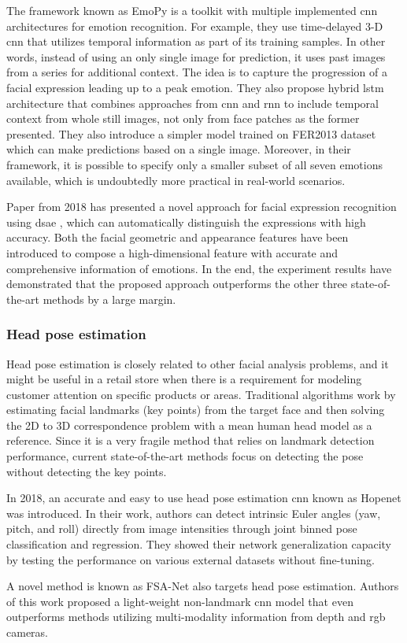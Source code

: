             The framework known as EmoPy \cite{emopy} is a toolkit with multiple implemented \gls{cnn} architectures for emotion recognition. For example, they use time-delayed 3-D \gls{cnn}  that utilizes temporal information as part of its training samples. In other words, instead of using an only single image for prediction, it uses past images from a series for additional context. The idea is to capture the progression of a facial expression leading up to a peak emotion. They also propose hybrid \gls{lstm} \cite{hochreiter1997long} architecture that combines approaches from \gls{cnn} and \gls{rnn} to include temporal context from whole still images, not only from face patches as the former presented. They also introduce a simpler model trained on FER2013 dataset \cite{goodfellow2013challenges} which can make predictions based on a single image. Moreover, in their framework, it is possible to specify only a smaller subset of all seven emotions available, which is undoubtedly more practical in real-world scenarios.
            
            Paper \cite{zeng2018facial} from 2018 has presented a novel approach for facial expression recognition using \gls{dsae} \cite{sun2016sparse}, which can automatically distinguish the expressions with high accuracy. Both the facial geometric and appearance features have been introduced to compose a high-dimensional feature with accurate and comprehensive information of emotions. In the end, the experiment results have demonstrated that the proposed approach outperforms the other three state-of-the-art methods by a large margin.
             
        \subsubsection{Head pose estimation}
            Head pose estimation \cite{wang2018deep} is closely related to other facial analysis problems, and it might be useful in a retail store when there is a requirement for modeling customer attention on specific products or areas. Traditional algorithms work by estimating facial landmarks (key points) from the target face and then solving the 2D to 3D correspondence problem with a mean human head model as a reference. Since it is a very fragile method that relies on landmark detection performance, current state-of-the-art methods focus on detecting the pose without detecting the key points. 
            
            In 2018, an accurate and easy to use head pose estimation \gls{cnn} known as Hopenet \cite{Ruiz_2018_CVPR_Workshops} was introduced. In their work, authors can detect intrinsic Euler angles (yaw, pitch, and roll) directly from image intensities through joint binned pose classification and regression. They showed their network generalization capacity by testing the performance on various external datasets without fine-tuning. 
        
            A novel method is known as FSA-Net \cite{fsanet} also targets head pose estimation. Authors of this work proposed a light-weight non-landmark \gls{cnn} model that even outperforms methods utilizing multi-modality information from depth and \gls{rgb} cameras.